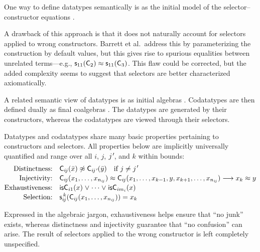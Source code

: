 One way to define datatypes semantically is as the initial model of the
selector--constructor equations \cite{barrett-et-al-2010}.
\begin{report}
A drawback of this approach is that it does
not naturally account for selectors applied to wrong constructors. Barrett et
al.\ address this by parameterizing the construction by default values, but
this gives rise to spurious equalities between unrelated terms---e.g.,
$\textsf{s}_{11}(\textsf{C}_2) \approx \textsf{s}_{11}(\textsf{C}_3)$. This flaw
could be corrected, but the added complexity seems to suggest that selectors
are better characterized axiomatically.

\end{report}
A related semantic view of datatypes is as initial algebras \cite{xxx}.
Codatatypes are then defined dually as final coalgebras \cite{xxx}. The
datatypes are generated by their constructors, whereas the codatatypes are
viewed through their selectors.

Datatypes and codatatypes share many basic properties pertaining to
constructors and selectors. All properties below are implicitly universally
quantified and range over all $i$, $j$, $\jPrime$, and $k$ within bounds:
%
\[
\begin{aligned}[t]
\text{Distinctness:}\quad
  & %
    \smash{\const{C}_{i\negvthinspace j}(\bar x) \tneq \const{C}_{i\negvthinspace \jPrime}(\bar y) \quad\text{if $j \not= \jPrime$}}
  \\[-.5\jot]
\text{Injectivity:}\quad
  & %
    \smash{\const{C}_{i\negvthinspace j}(x_1,\ldots,x_{n_{i\negvthinspace j}}) \teq \const{C}_{i\negvthinspace j}(x_1,\ldots,x_{k-1},y,x_{k+1},\ldots,x_{n_{i\negvthinspace j}}) \longrightarrow x_k \teq y}
  \\[-.5\jot]
\text{Exhaustiveness:}\quad
  & \smash{\is{C}_{i1}(x) \mathrel\lor \cdots \mathrel\lor \is{C}_{im_i}(x)}
  \\[-.5\jot]
\text{Selection:}\quad
  & \smash{\const{s}_{i\negvthinspace j}^{\,k}(\const{C}_{i\negvthinspace j}(x_1,\ldots,x_{n_{i\negvthinspace j}})) = x_k}
\end{aligned}
\]
%
\begin{report}
Expressed in the algebraic jargon, exhaustiveness helps ensure that ``no
junk'' exists, whereas distinctness and injectivity guarantee that ``no
confusion'' can arise.
The result of selectors applied to the wrong
constructor is left completely unspecified.
\end{report}

